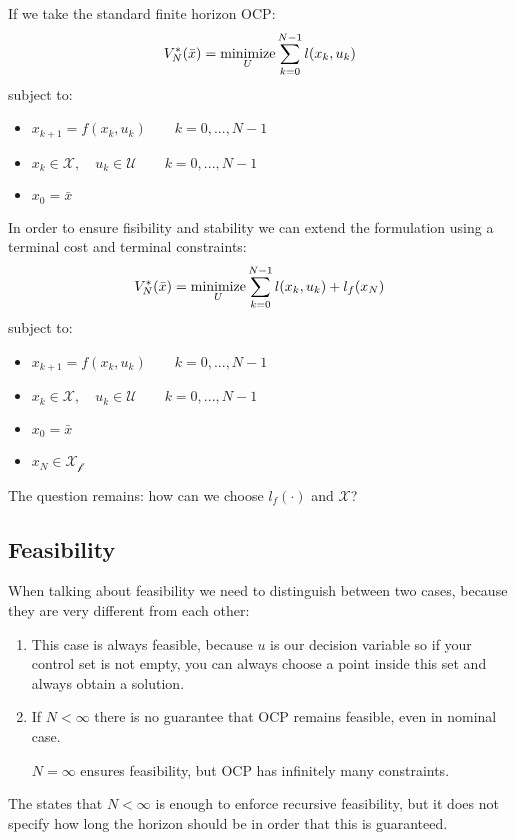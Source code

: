 If we take the standard finite horizon OCP:
\[V^*_N(\bar{x}) = \operatorname*{minimize}_U \sum_{k=0}^{N-1} l(x_k, u_k)\]
subject to:
\begin{itemize}
\item $x_{k+1} = f(x_k, u_k)\qquad k = 0,...,N-1$
\item $x_k\in\mathcal{X},\quad u_k\in\mathcal{U}\qquad k= 0,...,N-1$
\item $x_0 = \bar{x}$
\end{itemize}
In order to ensure fisibility and stability we can extend the formulation using a terminal cost and terminal constraints:
\[V^*_N(\bar{x}) = \operatorname*{minimize}_U \sum_{k=0}^{N-1} l(x_k, u_k) + l_f(x_N)\]
subject to:
\begin{itemize}
\item $x_{k+1} = f(x_k, u_k)\qquad k = 0,...,N-1$
\item $x_k\in\mathcal{X},\quad u_k\in\mathcal{U}\qquad k= 0,...,N-1$
\item $x_0 = \bar{x}$
\item $x_N\in\mathcal{X_f}$
\end{itemize}

The question remains: how can we choose $l_f(\cdot)$ and $\mathcal{X}$?

\subsection{Feasibility}
When talking about feasibility we need to distinguish between two cases, because they are very different from each other:
\begin{enumerate}
\item {}

This case is always feasible, because $u$ is our decision variable so if your control set is not empty, you can always choose a point inside this set and always obtain a solution.
\item {}

If $N< \infty$ there is no guarantee that OCP remains feasible, even in nominal case.

$N=\infty$ ensures feasibility, but OCP has infinitely many constraints.
\end{enumerate}

The  states that $N<\infty$ is enough to enforce recursive feasibility, but it does not specify how long the horizon should be in order that this is guaranteed.

